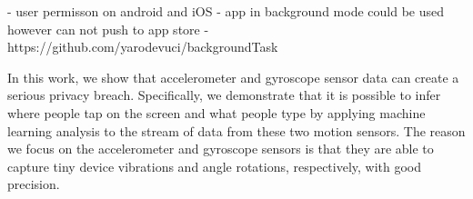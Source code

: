 - user permisson on android and iOS
- app in background mode could be used however can not push to app store
- https://github.com/yarodevuci/backgroundTask

In this work, we show that accelerometer
and gyroscope sensor data can create a serious
privacy breach. Specifically, we demonstrate that it is possible
to infer where people tap on the screen and what people
type by applying machine learning analysis to the stream of
data from these two motion sensors. The reason we focus
on the accelerometer and gyroscope sensors is that they are
able to capture tiny device vibrations and angle rotations,
respectively, with good precision.













